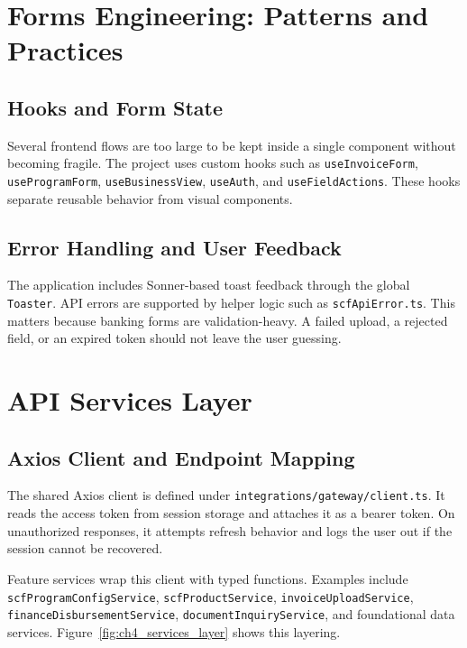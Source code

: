\section{Forms Engineering: Patterns and Practices}
\label{sec:forms_engineering}

\subsection{Hooks and Form State}
\label{subsec:hooks_form_state}

Several frontend flows are too large to be kept inside a single component without becoming fragile. The project uses custom hooks such as \texttt{useInvoiceForm}, \texttt{useProgramForm}, \texttt{useBusinessView}, \texttt{useAuth}, and \texttt{useFieldActions}. These hooks separate reusable behavior from visual components.

\subsection{Error Handling and User Feedback}
\label{subsec:error_feedback}

The application includes Sonner-based toast feedback through the global \texttt{Toaster}. API errors are supported by helper logic such as \texttt{scfApiError.ts}. This matters because banking forms are validation-heavy. A failed upload, a rejected field, or an expired token should not leave the user guessing.

\section{API Services Layer}
\label{sec:api_services_layer}

\subsection{Axios Client and Endpoint Mapping}
\label{subsec:axios_endpoint_mapping}

The shared Axios client is defined under \texttt{integrations/gateway/client.ts}. It reads the access token from session storage and attaches it as a bearer token. On unauthorized responses, it attempts refresh behavior and logs the user out if the session cannot be recovered.

Feature services wrap this client with typed functions. Examples include \texttt{scfProgramConfigService}, \texttt{scfProductService}, \texttt{invoiceUploadService}, \texttt{financeDisbursementService}, \texttt{documentInquiryService}, and foundational data services. Figure~\ref{fig:ch4_services_layer} shows this layering.

